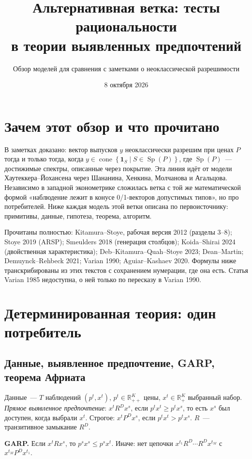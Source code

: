\documentclass[a4paper,11pt]{article}
\title{Альтернативная ветка: тесты рациональности\\ в теории выявленных предпочтений}
\author{Обзор моделей для сравнения с заметками о неоклассической разрешимости}
\date{8 октября 2026}
\theoremstyle{plain}
\theoremstyle{definition}
\theoremstyle{remark}
\newcommand{\R}{\mathbb{R}}
\newcommand{\set}[1]{\left\{ #1 \right\}}
\newcommand{\Rpp}[1][2]{\R^{#1}_{++}} %
\newcommand{\Rp}[1][2]{\R^{#1}_{+}}   %
\DeclareMathOperator{\cone}{cone}
\DeclareMathOperator{\Sp}{Sp}
\begin{document}
\maketitle
\tableofcontents

\section*{Зачем этот обзор и что прочитано}

В заметках доказано: вектор выпусков $y$ неоклассически разрешим при ценах $P$ тогда и только тогда, когда $y\in\cone\set{\mathbf 1_S\mid S\in\Sp(P)}$, где $\Sp(P)$~--- достижимые спектры, описанные через покрытие. Эта линия идёт от модели Хаутеккера--Йохансена через Шананина, Хенкина, Молчанова и Агальцова. Независимо в западной эконометрике сложилась ветка с той же математической формой «наблюдение лежит в конусе 0/1-векторов допустимых типов», но про потребителей. Ниже каждая модель этой ветки описана по первоисточнику: примитивы, данные, гипотеза, теорема, алгоритм.

Прочитаны полностью: Kitamura--Stoye, рабочая версия 2012 (разделы 3--8); Stoye 2019 (ARSP); Smeulders 2018 (генерация столбцов); Koida--Shirai 2024 (двойственная характеристика); Deb--Kitamura--Quah--Stoye 2023; Dean--Martin; Demuynck--Rehbeck 2021; Varian 1990; Aguiar--Kashaev 2020. Формулы ниже транскрибированы из этих текстов с сохранением нумерации, где она есть. Статья Varian 1985 недоступна, о ней только по пересказу в Varian 1990.

\section{Детерминированная теория: один потребитель}

\subsection{Данные, выявленное предпочтение, GARP, теорема Африата}

Данные~--- $T$ наблюдений $(p^t,x^t)$, $p^t\in\Rpp[K]$ цены, $x^t\in\Rp[K]$ выбранный набор. \textit{Прямое выявленное предпочтение}: $x^tR^Dx^s$, если $p^tx^t\ge p^tx^s$, то есть $x^s$ был доступен, когда выбрали $x^t$. Строгое: $x^tP^Dx^s$, если $p^tx^t>p^tx^s$. $R$~--- транзитивное замыкание $R^D$.

\textbf{GARP.} Если $x^tRx^s$, то $p^sx^s\le p^sx^t$. Иначе: нет цепочки $x^{t_1}R^D\cdots R^Dx^{t_M}$ с $x^{t_M}P^Dx^{t_1}$.
\end{document}
